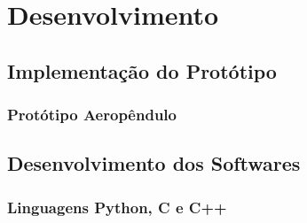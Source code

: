 \chapter{Desenvolvimento}
\label{cap_desenvolvimento}

%






%


\newpage
\section{Implementação do Protótipo}
\label{implementacao_prototipo}

\subsection{Protótipo Aeropêndulo}




\section{Desenvolvimento dos Softwares}
\label{dev_softwares}


\subsection{Linguagens Python, C e C++}



